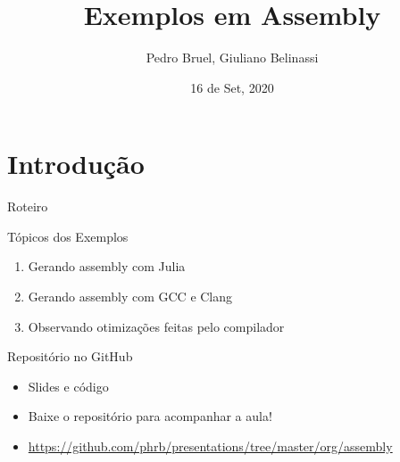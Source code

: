 \documentclass[10pt, compress, aspectratio=169, xcolor={table,usenames,dvipsnames}]{beamer}
\author{ \footnotesize Pedro Bruel, Giuliano Belinassi}
\date{ \scriptsize 16 de Set, 2020}
\title{Exemplos em Assembly}
\begin{document}
\maketitle

\section{Introdução}
\label{sec:org19d9412}
\begin{frame}[label={sec:orga2dff84}]{Roteiro}
\begin{block}{Tópicos dos Exemplos}
\begin{enumerate}
\item Gerando assembly com Julia
\item Gerando assembly com GCC e Clang
\item Observando otimizações feitas pelo compilador
\end{enumerate}
\end{block}
\begin{block}{Repositório no GitHub}
\begin{itemize}
\item Slides e código
\item Baixe o repositório para acompanhar a aula!
\item \url{https://github.com/phrb/presentations/tree/master/org/assembly}
\end{itemize}
\end{block}
\end{frame}
\end{document}

